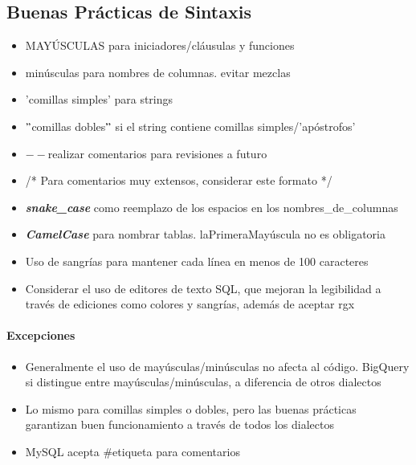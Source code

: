 \subsection{Buenas Prácticas de Sintaxis}
\begin{itemize}
    \item {MAYÚSCULAS para iniciadores/cláusulas y funciones}
    \item {minúsculas para nombres de columnas. evitar mezclas}
    \item {'comillas simples' para strings}
    \item {${"}$comillas dobles${"}$ si el string contiene comillas simples/'apóstrofos'}
    \item {${--}$realizar comentarios para revisiones a futuro}
    \item{/* Para comentarios muy extensos, considerar este formato */}
    \item {\textbf{\textit{snake\_case}} como reemplazo de los espacios en los nombres\_de\_columnas}
    \item {\textbf{\textit{CamelCase}} para nombrar tablas. laPrimeraMayúscula no es obligatoria}
    \item {Uso de sangrías para mantener cada línea en menos de 100 caracteres}
    \item {Considerar el uso de editores de texto SQL, que mejoran la legibilidad a través de ediciones como colores y sangrías, además de aceptar \gls{rgx}}
\end{itemize}

\paragraph{Excepciones}
\begin{itemize}
    \item {Generalmente el uso de mayúsculas/minúsculas no afecta al código. BigQuery si distingue entre mayúsculas/minúsculas, a diferencia de otros dialectos}
    \item {Lo mismo para comillas simples o dobles, pero las buenas prácticas garantizan buen funcionamiento a través de todos los dialectos}
    \item {MySQL acepta \#etiqueta para comentarios}
\end{itemize}

\newpage